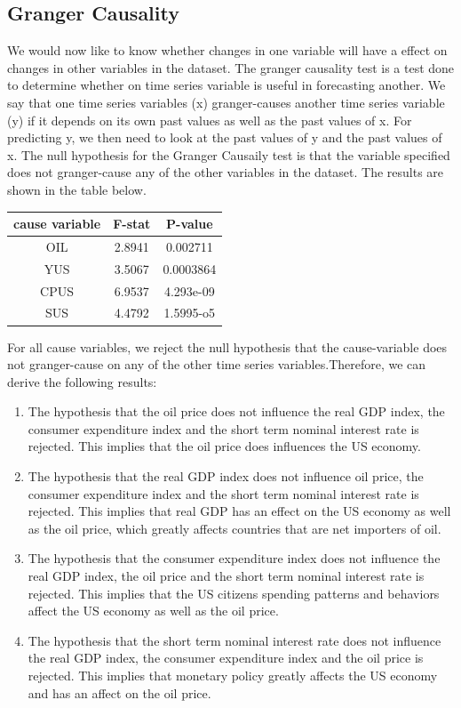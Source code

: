 \documentclass[11pt,preprint, authoryear]{elsarticle}
\numberwithin{equation}{section}
\numberwithin{figure}{section}
\numberwithin{table}{section}
\begin{document}
\hypertarget{granger-causality}{%
\subsection{Granger Causality}\label{granger-causality}}

We would now like to know whether changes in one variable will have a
effect on changes in other variables in the dataset. The granger
causality test is a test done to determine whether on time series
variable is useful in forecasting another. We say that one time series
variables (x) granger-causes another time series variable (y) if it
depends on its own past values as well as the past values of x. For
predicting y, we then need to look at the past values of y and the past
values of x. The null hypothesis for the Granger Causaily test is that
the variable specified does not granger-cause any of the other variables
in the dataset. The results are shown in the table below.

\begin{center}
\begin{tabular}{ |c|c|c| } 
 \hline
 cause variable & F-stat & P-value \\ 
 \hline
 OIL & 2.8941 & 0.002711\\ 
 YUS & 3.5067 & 0.0003864 \\
 CPUS & 6.9537 & 4.293e-09\\
 SUS & 4.4792 & 1.5995-o5 \\
 \hline
\end{tabular}
\end{center}

For all cause variables, we reject the null hypothesis that the
cause-variable does not granger-cause on any of the other time series
variables.Therefore, we can derive the following results:

\begin{enumerate}
\item The hypothesis that the oil price does not influence the real GDP index, the consumer expenditure index and the short term nominal interest rate is rejected. This implies that the oil price does influences the US economy. 
\item The hypothesis that the real GDP index does not influence oil price, the consumer expenditure index and the short term nominal interest rate is rejected. This implies that real GDP has an effect on the US economy as well as the oil price, which greatly affects countries that are net importers of oil. 
\item The hypothesis that the consumer expenditure index does not influence the real GDP index, the oil price and the short term nominal interest rate is rejected. This implies that the US citizens spending patterns and behaviors affect the US economy as well as the oil price. 
\item The hypothesis that the short term nominal interest rate does not influence the real GDP index, the consumer expenditure index and the oil price is rejected. This implies that monetary policy greatly affects the US economy and has an affect on the oil price.
\end{enumerate}
\end{document}
